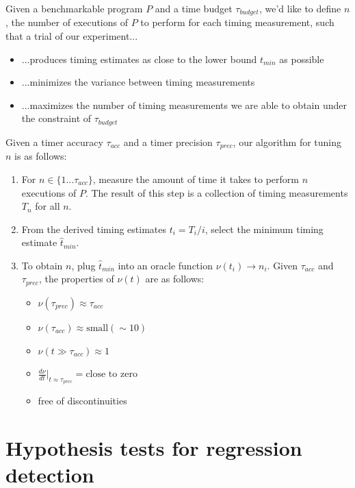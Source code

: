 \documentclass[conference]{IEEEtran}
\begin{document}
Given a benchmarkable program $P$ and a time budget $\tau_{budget}$, we'd like to define
$n$, the number of executions of $P$ to perform for each timing measurement, such that a
trial of our experiment...

\begin{itemize}
    \item ...produces timing estimates as close to the lower bound $t_{min}$ as possible
    \item ...minimizes the variance between timing measurements
    \item ...maximizes the number of timing measurements we are able to obtain under the
    constraint of $\tau_{budget}$
\end{itemize}

Given a timer accuracy $\tau_{acc}$ and a timer precision $\tau_{prec}$, our algorithm for
tuning $n$ is as follows:

\begin{enumerate}
    \item For $n \in \{1...\tau_{acc}\}$, measure the amount of time it takes to perform $n$
    executions of $P$. The result of this step is a collection of timing measurements $T_n$
    for all $n$.
    \item From the derived timing estimates $t_i = T_i / i$, select the minimum timing
    estimate $\hat{t}_{min}$.
    \item To obtain $n$, plug $\hat{t}_{min}$ into an oracle function $\nu(t_i) \to n_i$.
    Given $\tau_{acc}$ and $\tau_{prec}$, the properties of $\nu(t)$ are as follows:
    \begin{itemize}
        \item $\nu(\tau_{prec}) \approx \tau_{acc}$
        \item $\nu(\tau_{acc}) \approx \text{small} (\sim 10)$
        \item $\nu(t \gg \tau_{acc}) \approx 1$
        \item $\frac{d\nu}{dt}\big|_{t \approx \tau_{prec}} = \text{close to zero}$
        \item free of discontinuities 
    \end{itemize}
\end{enumerate}

\label{sec:hypotesting}
\section{Hypothesis tests for regression detection}
\end{document}
